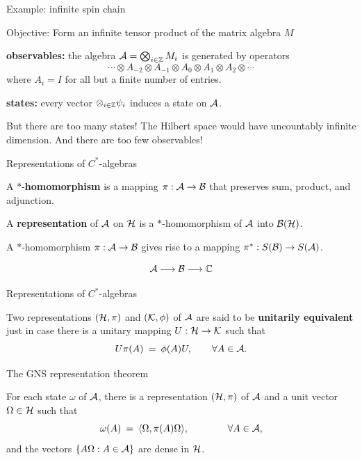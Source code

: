 \documentclass[8pt]{beamer}
\begin{document}
\begin{frame}{Example: infinite spin chain}

  Objective: Form an infinite tensor product of the matrix algebra $M$

  \bigskip \textbf{observables:} the algebra $\mathcal A = \bigotimes
  _{i\in \mathbb Z} M_i$ is generated by operators
$$ \cdots \otimes A_{-2}\otimes A_{-1}\otimes A_0\otimes A_1\otimes A_2 \otimes \cdots $$
where $A_i=I$ for all but a finite number of entries.

\bigskip \textbf{states:} every vector $\otimes _{i\in\mathbb Z} \psi _i$
induces a state on $\mathcal A$.

\bigskip But there are too many states!  The Hilbert space would have
uncountably infinite dimension.  And there are too few observables!

\end{frame}

\begin{frame}{Representations of $C^*$-algebras}

  A $*$-\textbf{homomorphism} is a mapping $\pi :\mathcal A\to\mathcal B$ that
  preserves sum, product, and adjunction.

  \bigskip A \textbf{representation} of $\mathcal A$ on $\mathcal H$ is a
  $*$-homomorphism of $\mathcal A$ into $\mathcal B (\mathcal H )$.

  \bigskip A $*$-homomorphism $\pi :\mathcal A\to \mathcal B$ gives rise to a mapping $\pi ^*:S(\mathcal B )\to S(\mathcal A )$.

$$ \mathcal A \longrightarrow \mathcal B \longrightarrow \mathbb C $$




\end{frame}
\begin{frame}{Representations of $C^*$-algebras}

  \bigskip Two representations $(\mathcal H ,\pi )$ and $(\mathcal K ,\phi )$ of
  $\mathcal A$ are said to be \textbf{unitarily equivalent} just in case
  there is a unitary mapping $U:\mathcal H\to\mathcal K$ such that
$$ U\pi (A) \: = \: \phi (A)U ,\qquad \forall A\in \mathcal A .$$





\end{frame}


\begin{frame}{The GNS representation theorem}

  For each state $\omega$ of $\mathcal A$, there is a representation $(\mathcal H
  ,\pi )$ of $\mathcal A$ and a unit vector $\Omega\in\mathcal H$ such that
$$ \omega (A) \: =\: \langle \Omega ,\pi (A)\Omega \rangle ,\qquad \qquad \forall A\in \mathcal A ,$$
and the vectors $\{ A\Omega : A\in \mathcal A \}$ are dense in $\mathcal H$.

\end{frame}
\end{document}
